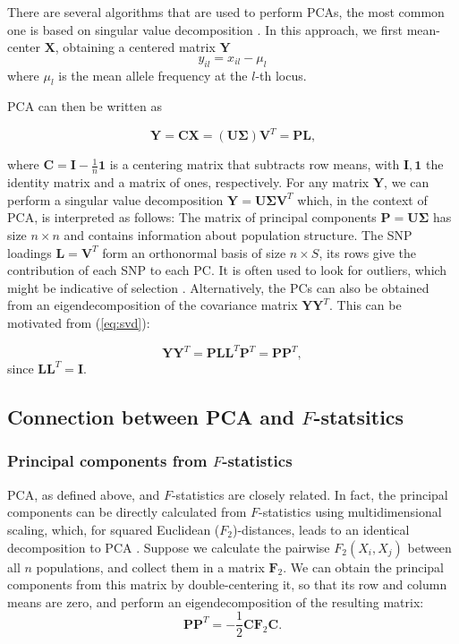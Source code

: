 \documentclass[12pt,fullpage, a4paper]{article}
\newcommand{\MX}{\mathbf{X}} %
\newcommand{\MC}{\mathbf{C}} %
\newcommand{\MY}{\mathbf{Y}} %
\newcommand{\MF}{\mathbf{F}_2} %
\newcommand{\MP}{\mathbf{P}} %
\newcommand{\ML}{\mathbf{L}} %
\newcommand{\MSINGULAR}{\mathbf{\Sigma}} %
\begin{document}
There are several algorithms that are used to perform PCAs, the most common one is based on singular value decomposition \citep[e.g.][]{jolliffe2013}. In this approach, we first mean-center $\MX$, obtaining a centered matrix $\MY$
	\begin{equation*}
	y_{il} = x_{il} - \mu_l
	\end{equation*}
	where $\mu_l$ is the mean allele frequency at the $l$-th locus.
	
	PCA can then be written as
	
	\begin{equation}
	\MY = \MC\MX = (\mathbf{U} \MSINGULAR) \mathbf{V}^T = \MP\ML\text{,} \label{eq:svd}
	\end{equation}
	
	where $\MC = \mathbf{I} -\frac{1}{n}\mathbf{1}$ is a centering matrix that subtracts row means, with $\mathbf{I}, \mathbf{1}$  the identity matrix and a matrix of ones, respectively. For any matrix $\MY$, we can perform a singular value decomposition $\MY = \mathbf{U}\MSINGULAR\mathbf{V}^T$ which, in the context of PCA, is interpreted as follows: The matrix of principal components $\MP=\mathbf{U}\MSINGULAR$ has size $n \times n$ and contains information about population structure. The SNP loadings $\ML=\mathbf{V}^T$ form an orthonormal basis of size $n \times S$, its rows give the contribution of each SNP to each PC. It is often used to look for outliers, which might be indicative of selection \citep[e.g][]{duforet-frebourg2016}. Alternatively, the PCs can also be obtained from an eigendecomposition of the covariance matrix $\MY\MY^T$. This can be motivated from (\ref{eq:svd}):
	
	\begin{equation}
	\MY\MY^T = \MP\ML\ML^T\MP^T = \MP\MP^T,
	\end{equation}
	since $\ML\ML^T=\mathbf{I}$.

\subsection{Connection between PCA and $F$-statsitics}	
\subsubsection{Principal components from $F$-statistics}
PCA, as defined above, and $F$-statistics are closely related. In fact, the principal components can be directly calculated from $F$-statistics using multidimensional scaling, which, for squared Euclidean ($F_2$)-distances, leads to an identical decomposition to PCA \citep{gower1966}. Suppose we calculate the pairwise $F_2(X_i, X_j)$ between all $n$ populations, and collect them in a matrix $\MF$. We can obtain the principal components from this matrix by double-centering it, so that its row and column means are zero, and perform an eigendecomposition of the resulting matrix:
\begin{equation}
\MP\MP^T = - \frac{1}{2}\MC\MF\MC \text{.} \label{eq:mds}
\end{equation}
\end{document}
